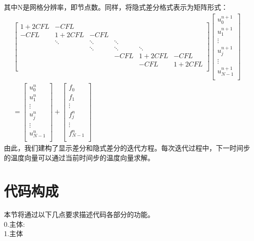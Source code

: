 \documentclass{article}
\begin{document}
		其中N是网格分辨率，即节点数。同样，将隐式差分格式表示为矩阵形式：
		$$
		\begin{aligned}
		\begin{bmatrix}
			1+2CFL & -CFL & & & & \\
			-CFL & 1+2CFL & -CFL & & &\\
			& \ddots &  \ddots & \ddots & &\\
			& & \ddots & \ddots & \ddots &\\
			& & & -CFL & 1+2CFL & -CFL \\
			& & & & -CFL & 1+2CFL\\
		\end{bmatrix}
		\begin{bmatrix}
			u_0^{n+1} \\
			u_1^{n+1} \\
			\vdots \\
			u_j^{n+1} \\
			\vdots \\
			u_{N-1}^{n+1} \\
		\end{bmatrix}
		\\
		=
		\begin{bmatrix}
			u_0^n \\
			u_1^n \\
			\vdots \\
			u_j^n \\
			\vdots \\
			u_{N-1}^n \\
		\end{bmatrix}+
		\begin{bmatrix}
			f_0 \\
			f_1 \\
			\vdots \\
			f_j^n \\
			\vdots \\
			f_{N-1}^n \\
		\end{bmatrix}
		\end{aligned}
		$$
		由此，我们建构了显示差分和隐式差分的迭代方程。每次迭代过程中，下一时间步的温度向量可以通过当前时间步的温度向量求解。
		
		\clearpage
		
		\section{代码构成}
		
		本节将通过以下几点要求描述代码各部分的功能。\\
		0.主体:
		\\
		1.主体
		
\end{document}
